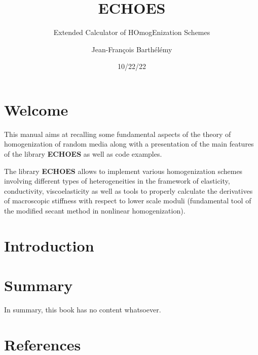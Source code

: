 \documentclass[
  letterpaper,
  DIV=11,
  numbers=noendperiod]{scrreprt}
\title{ECHOES}
\subtitle{Extended Calculator of HOmogEnization Schemes}
\author{Jean-François Barthélémy}
\date{10/22/22}
\renewcommand*\contentsname{Table of contents}
\newcommand\contentsname{Table of contents}
\begin{document}
\maketitle
\renewcommand*\contentsname{Table of contents}
{
\hypersetup{linkcolor=}
\setcounter{tocdepth}{2}
\tableofcontents
}

\hypertarget{welcome}{%
\chapter*{Welcome}\label{welcome}}


This manual aims at recalling some fundamental aspects of the theory of
homogenization of random media along with a presentation of the main
features of the library \textbf{ECHOES} as well as code examples.

The library \textbf{ECHOES} allows to implement various homogenization
schemes involving different types of heterogeneities in the framework of
elasticity, conductivity, viscoelasticity as well as tools to properly
calculate the derivatives of macroscopic stiffness with respect to lower
scale moduli (fundamental tool of the modified secant method in
nonlinear homogenization).


\hypertarget{introduction}{%
\chapter{Introduction}\label{introduction}}


\hypertarget{summary}{%
\chapter{Summary}\label{summary}}

In summary, this book has no content whatsoever.


\hypertarget{references}{%
\chapter*{References}\label{references}}

\end{document}
